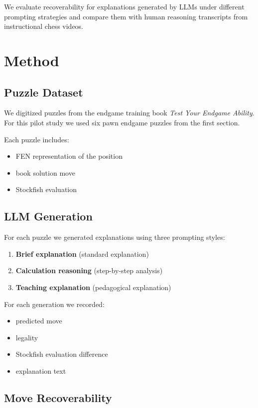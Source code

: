 \documentclass{article}
\begin{document}
We evaluate recoverability for explanations generated by LLMs under different prompting strategies and compare them with human reasoning transcripts from instructional chess videos.

\section{Method}

\subsection{Puzzle Dataset}

We digitized puzzles from the endgame training book \textit{Test Your Endgame Ability}. 
For this pilot study we used six pawn endgame puzzles from the first section.

Each puzzle includes:

\begin{itemize}
\item FEN representation of the position
\item book solution move
\item Stockfish evaluation
\end{itemize}

\subsection{LLM Generation}

For each puzzle we generated explanations using three prompting styles:

\begin{enumerate}
\item \textbf{Brief explanation} (standard explanation)
\item \textbf{Calculation reasoning} (step-by-step analysis)
\item \textbf{Teaching explanation} (pedagogical explanation)
\end{enumerate}

For each generation we recorded:

\begin{itemize}
\item predicted move
\item legality
\item Stockfish evaluation difference
\item explanation text
\end{itemize}

\subsection{Move Recoverability}
\end{document}
